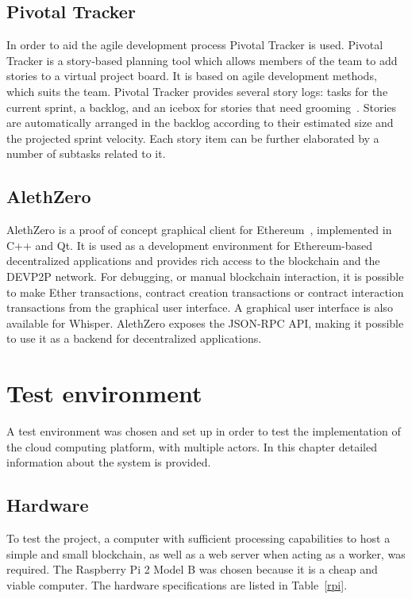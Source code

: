 \subsection{Pivotal Tracker}
In order to aid the agile development process Pivotal Tracker is used. Pivotal Tracker is a story-based planning tool which allows members of the team to add stories to a virtual project board. It is based on agile development methods, which suits the team. Pivotal Tracker provides several story logs: tasks for the current sprint, a backlog, and an icebox for stories that need grooming~\cite{pivotaltracker}. Stories are automatically arranged in the backlog according to their estimated size and the projected sprint velocity. Each story item can be further elaborated by a number of subtasks related to it. 

\subsection{AlethZero}
AlethZero is a proof of concept graphical client for Ethereum~\cite{github-alethzero}, implemented in C++ and Qt. It is used as a development environment for Ethereum-based decentralized applications and provides rich access to the blockchain and the DEVP2P network. For debugging, or manual blockchain interaction, it is possible to make Ether transactions, contract creation transactions or contract interaction transactions from the graphical user interface. A graphical user interface is also available for Whisper. AlethZero exposes the JSON-RPC API, making it possible to use it as a backend for decentralized applications.

\section{Test environment}
A test environment was chosen and set up in order to test the implementation of the cloud computing platform, with multiple actors. In this chapter detailed information about the system is provided.

\subsection{Hardware}
To test the project, a computer with sufficient processing capabilities to host a simple and small blockchain, as well as a web server when acting as a worker, was required. The Raspberry Pi 2 Model B was chosen because it is a cheap and viable computer. The hardware specifications are listed in Table~\ref{rpi}.

